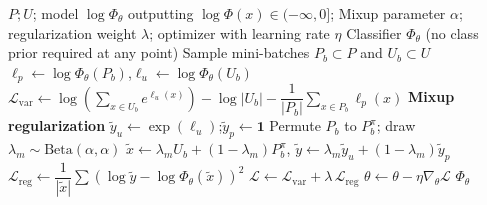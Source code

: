 \documentclass{article}
\begin{document}
\begin{algorithm}[!h]
\renewcommand{\algorithmicrequire}{\textbf{Input:}} %
\renewcommand{\algorithmicensure}{\textbf{Output:}} %
	\caption{VPU (variational PU learning, class-prior free)} %
	\begin{algorithmic}[1] %
	    \REQUIRE
	    $P;U$; model $\log\Phi_{\theta}$ outputting $\log\Phi(x)\in(-\infty,0]$;
	    Mixup parameter $\alpha$; regularization weight $\lambda$; optimizer with learning rate $\eta$
	    \ENSURE
	    Classifier $\Phi_{\theta}$ (no class prior required at any point)
	    \STATE Sample mini-batches $P_{b}\subset P$ and $U_{b}\subset U$
	    \STATE $\ell_{p}\leftarrow \log\Phi_{\theta}(P_{b})$,\quad $\ell_{u}\leftarrow \log\Phi_{\theta}(U_{b})$
	    \STATE $\mathcal{L}_{\mathrm{var}}\leftarrow \log\!\left(\sum_{x\in U_{b}}e^{\ell_{u}(x)}\right)-\log|U_{b}|-\dfrac{1}{|P_{b}|}\sum_{x\in P_{b}}\ell_{p}(x)$ %
	    \STATE \textbf{Mixup regularization}
	    \STATE \quad $\tilde{y}_{u}\leftarrow \exp(\ell_{u})$;\quad $\tilde{y}_{p}\leftarrow \mathbf{1}$ %
	    \STATE \quad Permute $P_{b}$ to $P_{b}^{\pi}$; draw $\lambda_{m}\sim \mathrm{Beta}(\alpha,\alpha)$
	    \STATE \quad $\tilde{x}\leftarrow \lambda_{m}U_{b}+(1-\lambda_{m})P_{b}^{\pi}$,\quad
	    $\tilde{y}\leftarrow \lambda_{m}\tilde{y}_{u}+(1-\lambda_{m})\tilde{y}_{p}$
	    \STATE \quad $\mathcal{L}_{\mathrm{reg}}\leftarrow \dfrac{1}{|\tilde{x}|}\sum\left(\log\tilde{y}-\log\Phi_{\theta}(\tilde{x})\right)^{2}$ %
	    \STATE $\mathcal{L}\leftarrow \mathcal{L}_{\mathrm{var}}+\lambda\,\mathcal{L}_{\mathrm{reg}}$
	    \STATE $\theta\leftarrow \theta-\eta\nabla_{\theta}\mathcal{L}$
	    \ENDWHILE
		\RETURN $\Phi_{\theta}$
	\end{algorithmic}
\end{algorithm}
\end{document}
